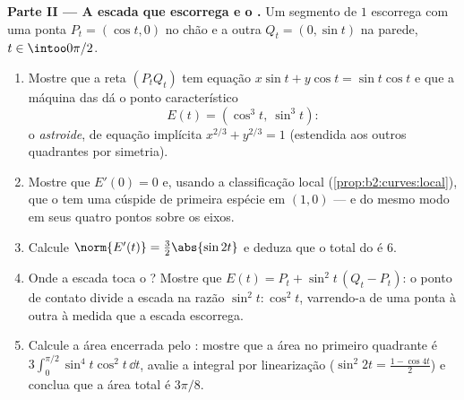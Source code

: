 \begin{problem}
\medskip
\noindent\textbf{Parte II --- A escada que escorrega e o
.} Um segmento de  $1$ escorrega com uma ponta $P_t =
(\cos t, 0)$ no chão e a outra $Q_t = (0, \sin t)$ na
parede, $t \in \intoo0{\pi/2}$.
\begin{enumerate}[resume]
  \item Mostre que a reta $(P_tQ_t)$ tem equação $x\sin t +
        y\cos t = \sin t\cos t$ e que a máquina das 
        dá o ponto característico
        \[
        E(t) = (\cos^3 t,\ \sin^3 t) :
        \]
        o \emph{astroide}, de equação
        implícita $x^{2/3} + y^{2/3} = 1$ (estendida aos
        outros quadrantes por simetria).
  \item Mostre que $E'(0) = 0$ e, usando a classificação
        local (\cref{prop:b2:curves:local}), que
        o  tem uma cúspide de primeira espécie em $(1, 0)$
        --- e do mesmo modo em seus quatro pontos sobre os eixos.
  \item Calcule $\norm{E'(t)} = \tfrac32\abs{\sin 2t}$ e
        deduza que o  total do  é $6$.
  \item Onde a escada toca o ? Mostre que $E(t) =
        P_t + \sin^2 t\,(Q_t - P_t)$: o ponto de contato
        divide a escada na razão $\sin^2 t : \cos^2
        t$, varrendo-a de uma ponta à outra à medida que a
        escada escorrega.
  \item Calcule a área encerrada pelo : mostre que
        a área no primeiro quadrante é $3\int_0^{\pi/2}\sin^4
        t\cos^2 t\,\dd t$, avalie a integral por
        linearização ($\sin^2 2t = \tfrac{1 - \cos 4t}2$)
        e conclua que a área total é $3\pi/8$.
\end{enumerate}


\end{problem}
